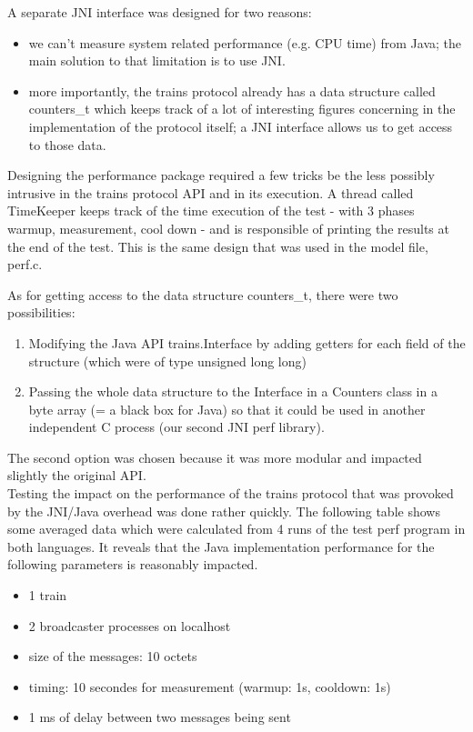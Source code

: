 \documentclass[a4paper,10pt]{report}
\begin{document}
A separate JNI  interface was designed for two reasons:
\begin{itemize}
	\item we can't measure system related performance (e.g. CPU time) from Java; the main solution to that limitation is to use JNI. 
	\item more importantly, the trains protocol already has a data structure called counters\_t which keeps track of a lot of interesting figures concerning in the implementation of the protocol itself; a JNI interface allows us to get access to those data.\\
\end{itemize}

Designing the performance package required a few tricks be the less possibly intrusive in the trains protocol API and in its execution.
A thread called TimeKeeper keeps track of the time execution of the test - with 3 phases warmup, measurement, cool down - and is responsible of printing the results at the end of the test. This is the same design that was used in the model file, perf.c.

As for getting access to the data structure counters\_t, there were two possibilities:
\begin{enumerate}
	\item Modifying the Java API trains.Interface by adding getters for each field of the structure (which were of type unsigned long long)
	\item Passing the whole data structure to the Interface in a Counters class in a byte array (= a black box for Java) so that it could be used in another independent  C process (our second JNI perf library).  
\end{enumerate} 

The second option was chosen because it was more modular and impacted slightly the original API.\\

Testing the impact on the performance of the trains protocol that was provoked by the JNI/Java overhead was done rather quickly. The following table shows some averaged data which were calculated from 4 runs of the test perf program in both languages. It reveals that the Java implementation performance for the following parameters is reasonably impacted.\\

\begin{itemize}
	\item 1 train	
	\item 2 broadcaster processes on localhost
	\item size of the messages: 10 octets
	\item timing: 10 secondes for measurement (warmup: 1s, cooldown: 1s)
	\item 1 ms of delay between two messages being sent
\end{itemize}
\end{document}
